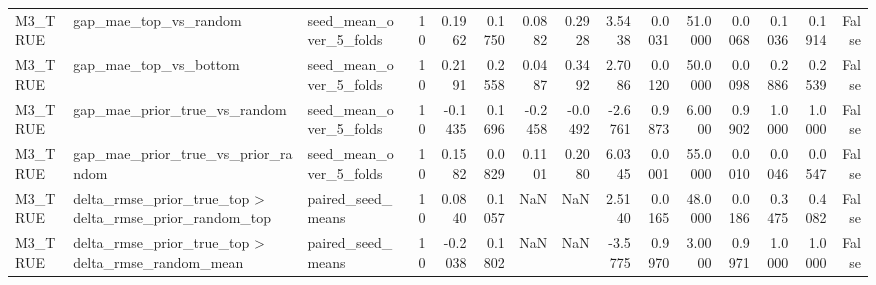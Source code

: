 \begin{tabular}{lllrrrrrrrrrrrr}
M3_TRUE & gap_mae_top_vs_random & seed_mean_over_5_folds & 10 & 0.1962 & 0.1750 & 0.0882 & 0.2928 & 3.5438 & 0.0031 & 51.0000 & 0.0068 & 0.1036 & 0.1914 & False \\
M3_TRUE & gap_mae_top_vs_bottom & seed_mean_over_5_folds & 10 & 0.2191 & 0.2558 & 0.0487 & 0.3492 & 2.7086 & 0.0120 & 50.0000 & 0.0098 & 0.2886 & 0.2539 & False \\
M3_TRUE & gap_mae_prior_true_vs_random & seed_mean_over_5_folds & 10 & -0.1435 & 0.1696 & -0.2458 & -0.0492 & -2.6761 & 0.9873 & 6.0000 & 0.9902 & 1.0000 & 1.0000 & False \\
M3_TRUE & gap_mae_prior_true_vs_prior_random & seed_mean_over_5_folds & 10 & 0.1582 & 0.0829 & 0.1101 & 0.2080 & 6.0345 & 0.0001 & 55.0000 & 0.0010 & 0.0046 & 0.0547 & False \\
M3_TRUE & delta_rmse_prior_true_top > delta_rmse_prior_random_top & paired_seed_means & 10 & 0.0840 & 0.1057 & NaN & NaN & 2.5140 & 0.0165 & 48.0000 & 0.0186 & 0.3475 & 0.4082 & False \\
M3_TRUE & delta_rmse_prior_true_top > delta_rmse_random_mean & paired_seed_means & 10 & -0.2038 & 0.1802 & NaN & NaN & -3.5775 & 0.9970 & 3.0000 & 0.9971 & 1.0000 & 1.0000 & False \\
\bottomrule
\end{tabular}
